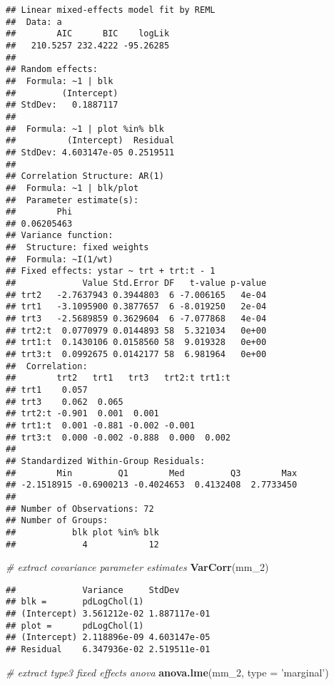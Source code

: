 \documentclass[]{book}
\newenvironment{Shaded}{\begin{snugshade}}{\end{snugshade}}
\newcommand{\CommentTok}[1]{\textcolor[rgb]{0.56,0.35,0.01}{\textit{#1}}}
\newcommand{\DataTypeTok}[1]{\textcolor[rgb]{0.13,0.29,0.53}{#1}}
\newcommand{\DecValTok}[1]{\textcolor[rgb]{0.00,0.00,0.81}{#1}}
\newcommand{\KeywordTok}[1]{\textcolor[rgb]{0.13,0.29,0.53}{\textbf{#1}}}
\newcommand{\NormalTok}[1]{#1}
\newcommand{\StringTok}[1]{\textcolor[rgb]{0.31,0.60,0.02}{#1}}
\begin{document}
\begin{verbatim}
## Linear mixed-effects model fit by REML
##  Data: a 
##        AIC      BIC    logLik
##   210.5257 232.4222 -95.26285
## 
## Random effects:
##  Formula: ~1 | blk
##         (Intercept)
## StdDev:   0.1887117
## 
##  Formula: ~1 | plot %in% blk
##          (Intercept)  Residual
## StdDev: 4.603147e-05 0.2519511
## 
## Correlation Structure: AR(1)
##  Formula: ~1 | blk/plot 
##  Parameter estimate(s):
##        Phi 
## 0.06205463 
## Variance function:
##  Structure: fixed weights
##  Formula: ~I(1/wt) 
## Fixed effects: ystar ~ trt + trt:t - 1 
##             Value Std.Error DF   t-value p-value
## trt2   -2.7637943 0.3944803  6 -7.006165   4e-04
## trt1   -3.1095900 0.3877657  6 -8.019250   2e-04
## trt3   -2.5689859 0.3629604  6 -7.077868   4e-04
## trt2:t  0.0770979 0.0144893 58  5.321034   0e+00
## trt1:t  0.1430106 0.0158560 58  9.019328   0e+00
## trt3:t  0.0992675 0.0142177 58  6.981964   0e+00
##  Correlation: 
##        trt2   trt1   trt3   trt2:t trt1:t
## trt1    0.057                            
## trt3    0.062  0.065                     
## trt2:t -0.901  0.001  0.001              
## trt1:t  0.001 -0.881 -0.002 -0.001       
## trt3:t  0.000 -0.002 -0.888  0.000  0.002
## 
## Standardized Within-Group Residuals:
##        Min         Q1        Med         Q3        Max 
## -2.1518915 -0.6900213 -0.4024653  0.4132408  2.7733450 
## 
## Number of Observations: 72
## Number of Groups: 
##           blk plot %in% blk 
##             4            12
\end{verbatim}

\begin{Shaded}
\begin{Highlighting}[]
\CommentTok{# extract covariance parameter estimates}
\KeywordTok{VarCorr}\NormalTok{(mm_}\DecValTok{2}\NormalTok{)}
\end{Highlighting}
\end{Shaded}

\begin{verbatim}
##             Variance     StdDev      
## blk =       pdLogChol(1)             
## (Intercept) 3.561212e-02 1.887117e-01
## plot =      pdLogChol(1)             
## (Intercept) 2.118896e-09 4.603147e-05
## Residual    6.347936e-02 2.519511e-01
\end{verbatim}

\begin{Shaded}
\begin{Highlighting}[]
\CommentTok{# extract type3 fixed effects anova}
\KeywordTok{anova.lme}\NormalTok{(mm_}\DecValTok{2}\NormalTok{, }\DataTypeTok{type =} \StringTok{'marginal'}\NormalTok{)}
\end{Highlighting}
\end{Shaded}
\end{document}
